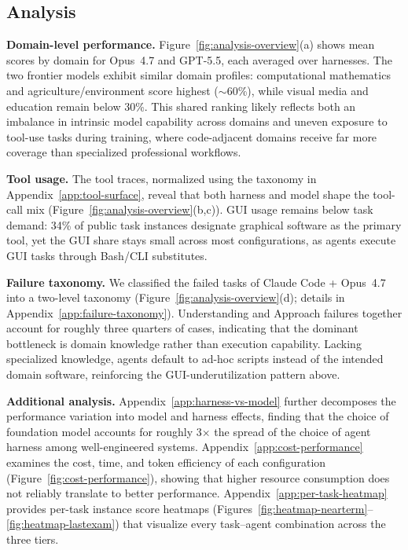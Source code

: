 \subsection{Analysis}
\label{sec:experiment-analysis}
\noindent \textbf{Domain-level performance.}
Figure~\ref{fig:analysis-overview}(a) shows mean scores by domain for Opus~4.7 and GPT-5.5, each averaged over harnesses.
The two frontier models exhibit similar domain profiles: computational mathematics and agriculture/environment score highest (${\sim}$60\%), while visual media and education remain below 30\%.
This shared ranking likely reflects both an imbalance in intrinsic model capability across domains and uneven exposure to tool-use tasks during training, where code-adjacent domains receive far more coverage than specialized professional workflows.

\noindent \textbf{Tool usage.}
The tool traces, normalized using the taxonomy in Appendix~\ref{app:tool-surface}, reveal that both harness and model shape the tool-call mix (Figure~\ref{fig:analysis-overview}(b,c)).
GUI usage remains below task demand: 34\% of public task instances designate graphical software as the primary tool, yet the GUI share stays small across most configurations, as agents execute GUI tasks through Bash/CLI substitutes.

\noindent \textbf{Failure taxonomy.}
We classified the failed tasks of Claude Code + Opus~4.7 into a two-level taxonomy (Figure~\ref{fig:analysis-overview}(d); details in Appendix~\ref{app:failure-taxonomy}).
Understanding and Approach failures together account for roughly three quarters of cases, indicating that the dominant bottleneck is domain knowledge rather than execution capability.
Lacking specialized knowledge, agents default to ad-hoc scripts instead of the intended domain software, reinforcing the GUI-underutilization pattern above.

\noindent \textbf{Additional analysis.}
Appendix~\ref{app:harness-vs-model} further decomposes the performance variation into model and harness effects, finding that the choice of foundation model accounts for roughly 3$\times$ the spread of the choice of agent harness among well-engineered systems.
Appendix~\ref{app:cost-performance} examines the cost, time, and token efficiency of each configuration (Figure~\ref{fig:cost-performance}), showing that higher resource consumption does not reliably translate to better performance.
Appendix~\ref{app:per-task-heatmap} provides per-task instance score heatmaps (Figures~\ref{fig:heatmap-nearterm}--\ref{fig:heatmap-lastexam}) that visualize every task--agent combination across the three tiers.
